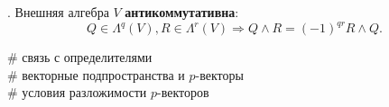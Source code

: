 \noindent
\socrat. Внешняя алгебра $V$ \textbf{антикоммутативна}:
\begin{equation}
    Q \in \Lambda^q(V), R \in \Lambda^r(V) \Rightarrow Q \wedge R = (-1)^{qr} R \wedge Q.
\end{equation}


\noindent
\# связь с определителями\\
\# векторные подпространства и $p$-векторы\\
\# условия разложимости $p$-векторов


